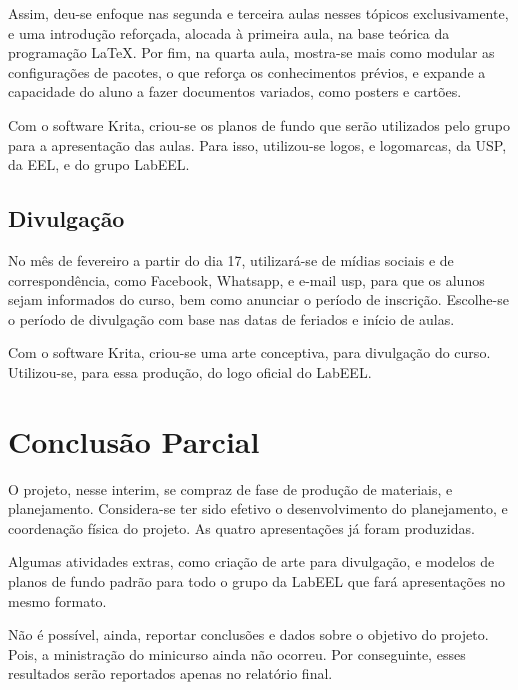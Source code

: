 \documentclass[
	12pt,				%
	openright,			%
	oneside,			%
	a4paper,			%
        brazil,				%
	]{abntex2}
\begin{document}
Assim, deu-se enfoque nas segunda e terceira aulas nesses
tópicos exclusivamente, e uma introdução reforçada, alocada à primeira
aula,  na base teórica da programação \LaTeX. Por fim, na quarta aula,
mostra-se mais como modular as configurações de pacotes, o que reforça
os conhecimentos prévios, e expande a capacidade do aluno a fazer
documentos variados, como posters e cartões.

Com o software Krita, criou-se os planos de fundo que serão utilizados
pelo grupo para a apresentação das aulas. Para isso, utilizou-se logos, e
logomarcas, da USP, da EEL, e do grupo LabEEL.

\section{Divulgação}

No mês de fevereiro a partir do dia 17, utilizará-se de mídias sociais e de correspondência, como Facebook,
Whatsapp, e e-mail usp, para que os alunos sejam informados do curso,
bem como anunciar o período de inscrição. Escolhe-se o período de
divulgação com base nas datas de feriados e início de aulas.

Com o software Krita, criou-se uma arte conceptiva, para divulgação do
curso. Utilizou-se, para essa produção, do logo oficial do LabEEL.


\chapter{Conclusão Parcial}

O projeto, nesse interim, se compraz de fase de produção de materiais,
e planejamento. Considera-se ter sido efetivo o desenvolvimento do
planejamento, e coordenação física do projeto. As quatro apresentações já
foram produzidas.

Algumas atividades extras, como criação de arte para divulgação, e
modelos de planos de fundo padrão para todo o grupo da LabEEL que fará
apresentações no mesmo formato.

Não é possível, ainda, reportar conclusões e dados sobre o objetivo do
projeto. Pois, a ministração do minicurso ainda não ocorreu. Por conseguinte,
esses resultados serão reportados apenas no relatório final.



\end{document}
